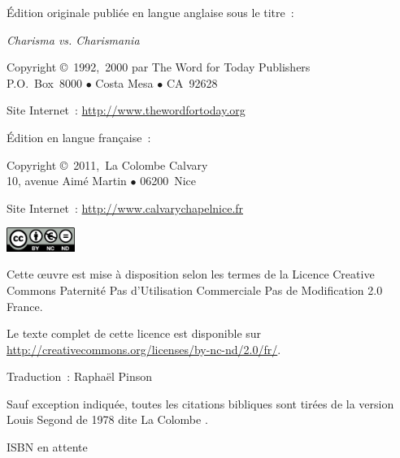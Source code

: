 \newpage
\mbox{}
\vfill


\par
\noindent Édition originale publiée en langue anglaise sous le titre~:

\noindent \emph{Charisma vs. Charismania}

\noindent Copyright \copyright{}~1992,~2000 par The Word for Today Publishers \\
 P.O.~Box~8000 $\bullet$ Costa Mesa $\bullet$ CA~92628

\noindent Site Internet~: \url{http://www.thewordfortoday.org}


\par
\noindent Édition en langue française~:

\noindent Copyright \copyright{}~2011,~La Colombe Calvary \\
 10, avenue Aimé Martin $\bullet$ 06200~Nice

\noindent Site Internet~: \url{http://www.calvarychapelnice.fr}


\par
{}

\noindent \includegraphics[width=6em]{by-nc-nd_eu}

\noindent Cette \oe{}uvre est mise à disposition selon les termes de la
 Licence Creative Commons Paternité
 \ocadr Pas d'Utilisation Commerciale \ocadr Pas de Modification 2.0 France.

\noindent Le texte complet de cette licence est disponible sur \\
 \url{http://creativecommons.org/licenses/by-nc-nd/2.0/fr/}.


\par
\noindent Traduction~: Raphaël Pinson

\noindent Sauf exception indiquée, toutes les citations bibliques sont
 tirées de la version Louis Segond de 1978 dite \og La Colombe \fg{}.


\par
\noindent ISBN en attente

